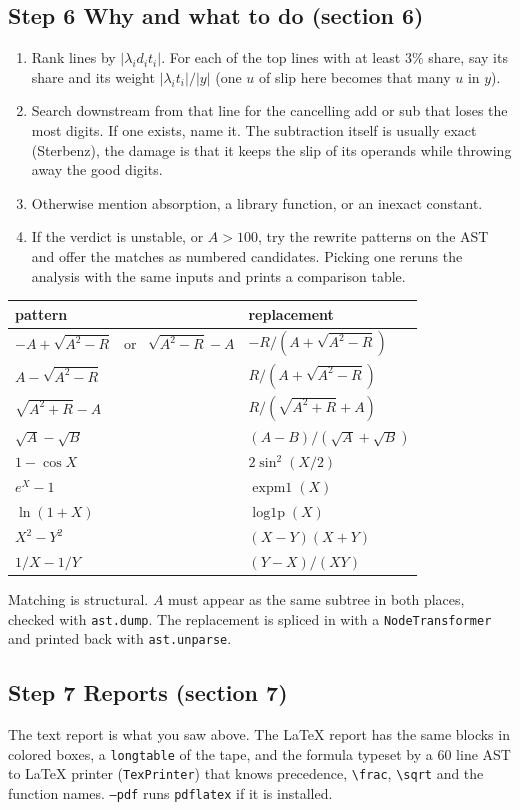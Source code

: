 \documentclass[11pt]{article}
\newcommand{\lam}{\lambda}
\begin{document}
\subsection*{Step 6 \quad Why and what to do (section 6)}
\begin{enumerate}
\item Rank lines by $|\lam_i d_i t_i|$. For each of the top lines with at least $3\%$ share, say its share and its weight $|\lam_i t_i|/|y|$ (one $u$ of slip here becomes that many $u$ in $y$).
\item Search downstream from that line for the cancelling add or sub that loses the most digits. If one exists, name it. The subtraction itself is usually exact (Sterbenz), the damage is that it keeps the slip of its operands while throwing away the good digits.
\item Otherwise mention absorption, a library function, or an inexact constant.
\item If the verdict is unstable, or $A > 100$, try the rewrite patterns on the AST and offer the matches as numbered candidates. Picking one reruns the analysis with the same inputs and prints a comparison table.
\end{enumerate}
\begin{center}
\begin{tabular}{@{}ll@{}}
\toprule
pattern & replacement \\
\midrule
$-A + \sqrt{A^2 - R}$ \ or \ $\sqrt{A^2-R} - A$ & $-R/(A + \sqrt{A^2 - R})$ \\
$A - \sqrt{A^2 - R}$ & $R/(A + \sqrt{A^2 - R})$ \\
$\sqrt{A^2 + R} - A$ & $R/(\sqrt{A^2+R} + A)$ \\
$\sqrt A - \sqrt B$ & $(A-B)/(\sqrt A + \sqrt B)$ \\
$1 - \cos X$ & $2\sin^{2}(X/2)$ \\
$e^{X} - 1$ & $\operatorname{expm1}(X)$ \\
$\ln(1 + X)$ & $\operatorname{log1p}(X)$ \\
$X^2 - Y^2$ & $(X-Y)(X+Y)$ \\
$1/X - 1/Y$ & $(Y-X)/(XY)$ \\
\bottomrule
\end{tabular}
\end{center}
Matching is structural. $A$ must appear as the same subtree in both places, checked with \texttt{ast.dump}. The replacement is spliced in with a \texttt{NodeTransformer} and printed back with \texttt{ast.unparse}.

\subsection*{Step 7 \quad Reports (section 7)}
The text report is what you saw above. The LaTeX report has the same blocks in colored boxes, a \texttt{longtable} of the tape, and the formula typeset by a 60 line AST to LaTeX printer (\texttt{TexPrinter}) that knows precedence, \verb|\frac|, \verb|\sqrt| and the function names. \texttt{--pdf} runs \texttt{pdflatex} if it is installed.
\end{document}
